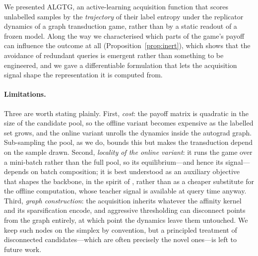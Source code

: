 \documentclass[11pt]{article}
\begin{document}
We presented ALGTG, an active-learning acquisition function that scores unlabelled
samples by the \emph{trajectory} of their label entropy under the replicator dynamics
of a graph transduction game, rather than by a static readout of a frozen model. Along
the way we characterised which parts of the game's payoff can influence the outcome at
all (Proposition~\ref{prop:inert}), which shows that the avoidance of redundant queries
is emergent rather than something to be engineered, and we gave a differentiable
formulation that lets the acquisition signal shape the representation it is computed
from. %

\paragraph{Limitations.} Three are worth stating plainly. First, \emph{cost}: the payoff
matrix is quadratic in the size of the candidate pool, so the offline variant becomes
expensive as the labelled set grows, and the online variant unrolls the dynamics inside
the autograd graph. Sub-sampling the pool, as we do, bounds this but makes the
transduction depend on the sample drawn. Second, \emph{locality of the online variant}:
it runs the game over a mini-batch rather than the full pool, so its equilibrium---and
hence its signal---depends on batch composition; it is best understood as an auxiliary
objective that shapes the backbone, in the spirit of \citet{yoo2019learning}, rather
than as a cheaper substitute for the offline computation, whose teacher signal is
available at query time anyway. Third, \emph{graph construction}: the acquisition
inherits whatever the affinity kernel and its sparsification encode, and aggressive
thresholding can disconnect points from the graph entirely, at which point the dynamics
leave them untouched. We keep such nodes on the simplex by convention, but a principled
treatment of disconnected candidates---which are often precisely the novel ones---is
left to future work.



\end{document}
